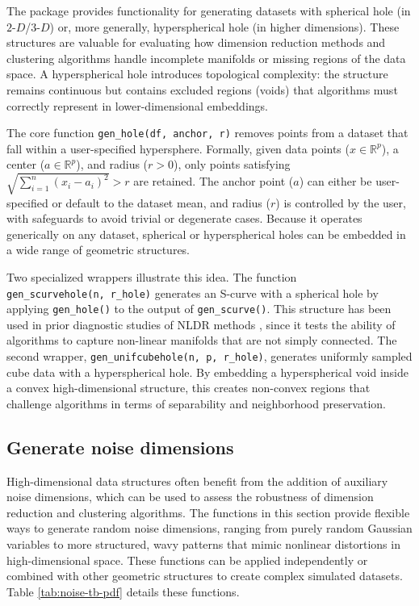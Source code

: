 The package provides functionality for generating datasets with spherical hole (in \(2\text{-}D\)/\(3\text{-}D\)) or, more generally, hyperspherical hole (in higher dimensions). These structures are valuable for evaluating how dimension reduction methods and clustering algorithms handle incomplete manifolds or missing regions of the data space. A hyperspherical hole introduces topological complexity: the structure remains continuous but contains excluded regions (voids) that algorithms must correctly represent in lower-dimensional embeddings.

The core function \texttt{gen\_hole(df,\ anchor,\ r)} removes points from a dataset that fall within a user-specified hypersphere. Formally, given data points (\(x \in \mathbb{R}^p\)), a center (\(a \in \mathbb{R}^p\)), and radius (\(r > 0\)), only points satisfying \(\sqrt{\sum_{i=1}^n(x_i-a_i)^2} > r\) are retained. The anchor point (\(a\)) can either be user-specified or default to the dataset mean, and radius (\(r\)) is controlled by the user, with safeguards to avoid trivial or degenerate cases. Because it operates generically on any dataset, spherical or hyperspherical holes can be embedded in a wide range of geometric structures.

Two specialized wrappers illustrate this idea. The function \texttt{gen\_scurvehole(n,\ r\_hole)} generates an S-curve with a spherical hole by applying \texttt{gen\_hole()} to the output of \texttt{gen\_scurve()}. This structure has been used in prior diagnostic studies of NLDR methods \citep[\citet{van2007}]{tenenbaum2000}, since it tests the ability of algorithms to capture non-linear manifolds that are not simply connected. The second wrapper, \texttt{gen\_unifcubehole(n,\ p,\ r\_hole)}, generates uniformly sampled cube data with a hyperspherical hole. By embedding a hyperspherical void inside a convex high-dimensional structure, this creates non-convex regions that challenge algorithms in terms of separability and neighborhood preservation.

\subsection{Generate noise dimensions}\label{generate-noise-dimensions}

High-dimensional data structures often benefit from the addition of auxiliary noise dimensions, which can be used to assess the robustness of dimension reduction and clustering algorithms. The functions in this section provide flexible ways to generate random noise dimensions, ranging from purely random Gaussian variables to more structured, wavy patterns that mimic nonlinear distortions in high-dimensional space. These functions can be applied independently or combined with other geometric structures to create complex simulated datasets. Table \ref{tab:noise-tb-pdf} details these functions.

